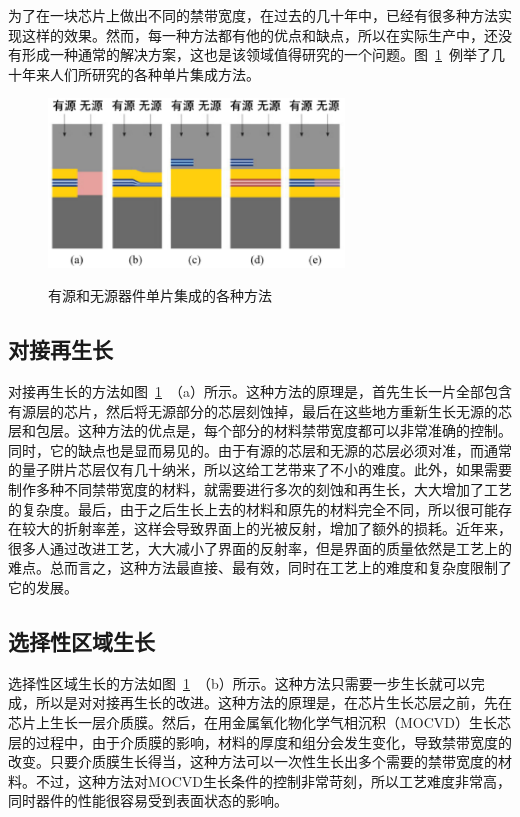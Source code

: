 \documentclass{ZJUthesis}
\begin{document}
为了在一块芯片上做出不同的禁带宽度，在过去的几十年中，已经有很多种方法实现这样的效果。然而，每一种方法都有他的优点和缺点，所以在实际生产中，还没有形成一种通常的解决方案，这也是该领域值得研究的一个问题。图~\ref{fig_pic_methods}~例举了几十年来人们所研究的各种单片集成方法。

\begin{figure}[htbp]
  \centering
  \includegraphics[width=0.7\textwidth]{./Pictures/pic_methods.eps}\\
  \caption{有源和无源器件单片集成的各种方法}
  \label{fig_pic_methods}
\end{figure}

\subsection{对接再生长}

对接再生长的方法如图~\ref{fig_pic_methods}~（a）所示。这种方法的原理是，首先生长一片全部包含有源层的芯片，然后将无源部分的芯层刻蚀掉，最后在这些地方重新生长无源的芯层和包层。这种方法的优点是，每个部分的材料禁带宽度都可以非常准确的控制。同时，它的缺点也是显而易见的。由于有源的芯层和无源的芯层必须对准，而通常的量子阱片芯层仅有几十纳米，所以这给工艺带来了不小的难度。此外，如果需要制作多种不同禁带宽度的材料，就需要进行多次的刻蚀和再生长，大大增加了工艺的复杂度。最后，由于之后生长上去的材料和原先的材料完全不同，所以很可能存在较大的折射率差，这样会导致界面上的光被反射，增加了额外的损耗。近年来，很多人通过改进工艺，大大减小了界面的反射率，但是界面的质量依然是工艺上的难点。总而言之，这种方法最直接、最有效，同时在工艺上的难度和复杂度限制了它的发展。

\subsection{选择性区域生长}

选择性区域生长的方法如图~\ref{fig_pic_methods}~（b）所示。这种方法只需要一步生长就可以完成，所以是对对接再生长的改进。这种方法的原理是，在芯片生长芯层之前，先在芯片上生长一层介质膜。然后，在用金属氧化物化学气相沉积（MOCVD）生长芯层的过程中，由于介质膜的影响，材料的厚度和组分会发生变化，导致禁带宽度的改变。只要介质膜生长得当，这种方法可以一次性生长出多个需要的禁带宽度的材料。不过，这种方法对MOCVD生长条件的控制非常苛刻，所以工艺难度非常高，同时器件的性能很容易受到表面状态的影响。
\end{document}
